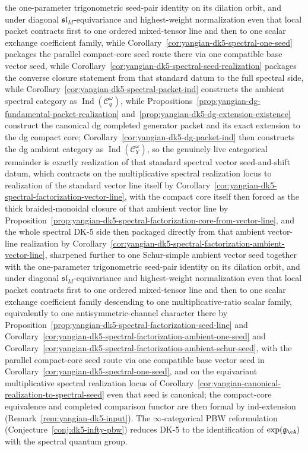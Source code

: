 \begin{enumerate}[label=\textup{(\roman*)}]
  the one-parameter trigonometric seed-pair identity on its dilation
  orbit, and under diagonal \(\mathfrak{sl}_M\)-equivariance and
  highest-weight normalization even that local packet contracts first
  to one ordered mixed-tensor line and then to one scalar exchange
  coefficient family,
  while Corollary~\ref{cor:yangian-dk5-spectral-one-seed}
  packages the parallel compact-core seed route there via one
  compatible base vector seed,
  while
  Corollary~\ref{cor:yangian-dk5-spectral-seed-realization}
  packages the converse closure statement from that standard datum to
  the full spectral side, while
  Corollary~\ref{cor:yangian-dk5-spectral-packet-ind} constructs the
  ambient spectral category as
  \(\operatorname{Ind}(\mathcal{C}_q^\omega)\), while
  Propositions~\ref{prop:yangian-dg-fundamental-packet-realization}
  and~\ref{prop:yangian-dk5-dg-extension-existence} construct the
  canonical dg completed generator packet and its exact extension to
  the dg compact core; Corollary~\ref{cor:yangian-dk5-dg-packet-ind}
  then constructs the dg ambient category as
  \(\operatorname{Ind}(\mathcal{C}_Y^\omega)\), so the genuinely live
  categorical remainder is exactly realization of that standard
  spectral vector seed-and-shift datum, which contracts on the
  multiplicative spectral realization locus to realization of the
  standard vector line itself by
  Corollary~\ref{cor:yangian-dk5-spectral-factorization-vector-line},
  with the compact core itself then forced as the thick
  braided-monoidal closure of that ambient vector line by
  Proposition~\ref{prop:yangian-dk5-spectral-factorization-core-from-vector-line},
  and the whole spectral DK-5 side then packaged directly from that
  ambient vector-line realization by
  Corollary~\ref{cor:yangian-dk5-spectral-factorization-ambient-vector-line},
  sharpened further to one Schur-simple ambient vector seed together
  with the one-parameter trigonometric seed-pair identity on its
  dilation orbit, and under diagonal \(\mathfrak{sl}_M\)-equivariance
  and highest-weight normalization even that local packet contracts
  first to one ordered mixed-tensor line and then to one scalar
  exchange coefficient family descending to one multiplicative-ratio
  scalar family, equivalently to one antisymmetric-channel character
  there
  by
  Proposition~\ref{prop:yangian-dk5-spectral-factorization-seed-line}
  and
  Corollary~\ref{cor:yangian-dk5-spectral-factorization-ambient-one-seed}
  and
  Corollary~\ref{cor:yangian-dk5-spectral-factorization-ambient-schur-seed},
  with the parallel compact-core seed route via one compatible base
  vector seed in Corollary~\ref{cor:yangian-dk5-spectral-one-seed}, and
  on the equivariant multiplicative spectral realization locus of
  Corollary~\ref{cor:yangian-canonical-realization-to-spectral-seed}
  even that seed is canonical;
  the compact-core equivalence and completed comparison functor are
  then formal by ind-extension
  \textup{(}Remark~\ref{rem:yangian-dk5-input}\textup{)}.
  The $\infty$-categorical PBW reformulation
  (Conjecture~\ref{conj:dk5-infty-pbw}) reduces DK-5 to the
  identification of $\exp(\mathfrak{g}_{\cA})$ with the spectral
  quantum group.
\end{enumerate}

